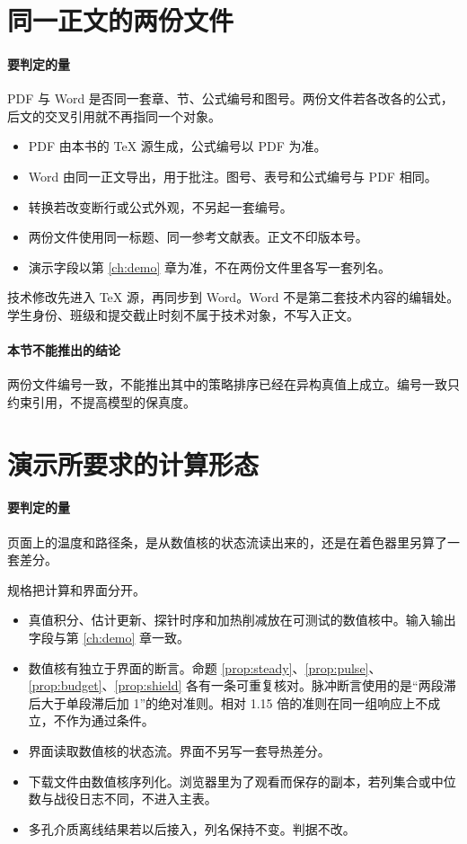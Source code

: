 \section{同一正文的两份文件}

\paragraph{要判定的量}
PDF 与 Word 是否同一套章、节、公式编号和图号。两份文件若各改各的公式，后文的交叉引用就不再指同一个对象。

\begin{itemize}
\item PDF 由本书的 TeX 源生成，公式编号以 PDF 为准。
\item Word 由同一正文导出，用于批注。图号、表号和公式编号与 PDF 相同。
\item 转换若改变断行或公式外观，不另起一套编号。
\item 两份文件使用同一标题、同一参考文献表。正文不印版本号。
\item 演示字段以第 \ref{ch:demo} 章为准，不在两份文件里各写一套列名。
\end{itemize}

技术修改先进入 TeX 源，再同步到 Word。Word 不是第二套技术内容的编辑处。学生身份、班级和提交截止时刻不属于技术对象，不写入正文。

\paragraph{本节不能推出的结论}
两份文件编号一致，不能推出其中的策略排序已经在异构真值上成立。编号一致只约束引用，不提高模型的保真度。

\section{演示所要求的计算形态}

\paragraph{要判定的量}
页面上的温度和路径条，是从数值核的状态流读出来的，还是在着色器里另算了一套差分。

规格把计算和界面分开。

\begin{itemize}
\item 真值积分、估计更新、探针时序和加热削减放在可测试的数值核中。输入输出字段与第 \ref{ch:demo} 章一致。
\item 数值核有独立于界面的断言。命题 \ref{prop:steady}、\ref{prop:pulse}、\ref{prop:budget}、\ref{prop:shield} 各有一条可重复核对。脉冲断言使用的是“两段滞后大于单段滞后加 1”的绝对准则。相对 1.15 倍的准则在同一组响应上不成立，不作为通过条件。
\item 界面读取数值核的状态流。界面不另写一套导热差分。
\item 下载文件由数值核序列化。浏览器里为了观看而保存的副本，若列集合或中位数与战役日志不同，不进入主表。
\item 多孔介质离线结果若以后接入，列名保持不变。判据不改。
\end{itemize}

